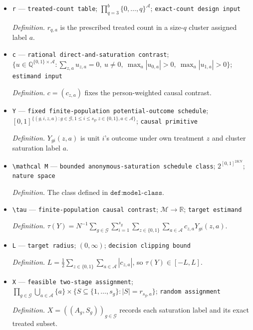\documentclass{article}
\begin{document}
\begin{itemize}
  \item \texttt{r} --- \texttt{treated-\allowbreak{}count table}; \(\prod_{q=3}^{b}\{0,\ldots,q\}^{\mathcal A}\); \texttt{exact-\allowbreak{}count design input}
  \par\smallskip\noindent\emph{Definition.} \(r_{q,a}\) is the prescribed treated count in a size-\(q\) cluster assigned label \(a\).
  \item \texttt{c} --- \texttt{rational direct-\allowbreak{}and-\allowbreak{}saturation contrast}; \(\{u\in\mathbb Q^{\{0,1\}\times\mathcal A}:\sum_{z,a}u_{z,a}=0,\ u\ne0,\ \max_a|u_{0,a}|>0,\ \max_a|u_{1,a}|>0\}\); \texttt{estimand input}
  \par\smallskip\noindent\emph{Definition.} \(c=(c_{z,a})\) fixes the person-weighted causal contrast.
  \item \texttt{Y} --- \texttt{fixed finite-\allowbreak{}population potential-\allowbreak{}outcome schedule}; \([0,1]^{\{(g,i,z,a):g\in\mathcal G,1\le i\le s_g,z\in\{0,1\},a\in\mathcal A\}}\); \texttt{causal primitive}
  \par\smallskip\noindent\emph{Definition.} \(Y_{g i}(z,a)\) is unit \(i\)'s outcome under own treatment \(z\) and cluster saturation label \(a\).
  \item \texttt{\textbackslash{}\allowbreak{}mathcal M} --- \texttt{bounded anonymous-\allowbreak{}saturation schedule class}; \(2^{[0,1]^{2KN}}\); \texttt{nature space}
  \par\smallskip\noindent\emph{Definition.} The class defined in \(\texttt{def:model-class}\).
  \item \texttt{\textbackslash{}\allowbreak{}tau} --- \texttt{finite-\allowbreak{}population causal contrast}; \(\mathcal M\to\mathbb R\); \texttt{target estimand}
  \par\smallskip\noindent\emph{Definition.} \(\tau(Y)=N^{-1}\sum_{g\in\mathcal G}\sum_{i=1}^{s_g}\sum_{z\in\{0,1\}}\sum_{a\in\mathcal A}c_{z,a}Y_{g i}(z,a)\).
  \item \texttt{L} --- \texttt{target radius}; \((0,\infty)\); \texttt{decision clipping bound}
  \par\smallskip\noindent\emph{Definition.} \(L=\frac12\sum_{z\in\{0,1\}}\sum_{a\in\mathcal A}|c_{z,a}|\), so \(\tau(Y)\in[-L,L]\).
  \item \texttt{X} --- \texttt{feasible two-\allowbreak{}stage assignment}; \(\prod_{g\in\mathcal G}\bigcup_{a\in\mathcal A}\{a\}\times\{S\subseteq\{1,\ldots,s_g\}:|S|=r_{s_g,a}\}\); \texttt{random assignment}
  \par\smallskip\noindent\emph{Definition.} \(X=((A_g,S_g))_{g\in\mathcal G}\) records each saturation label and its exact treated subset.

\end{itemize}
\end{document}
